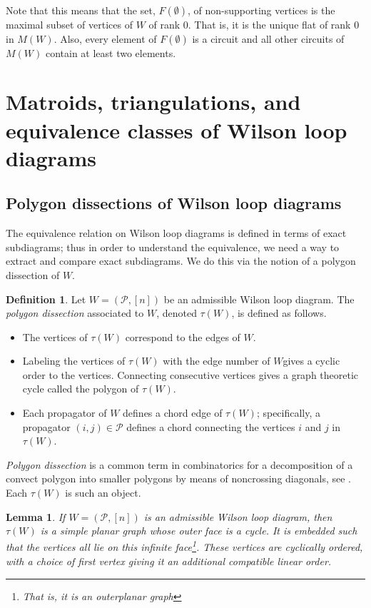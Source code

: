 \documentclass[11pt]{article}
\newcommand{\cP}{\mathcal{P}}
\newtheorem{lem}[thm]{Lemma}
\theoremstyle{remark}
\theoremstyle{definition}
\newtheorem{dfn}[thm]{Definition}
\begin{document}
Note that this means that the set, $F(\emptyset)$, of non-supporting vertices is the maximal subset of vertices of $W$ of rank $0$. That is, it is the unique flat of rank $0$ in $M(W)$. Also, every element of $F(\emptyset)$ is a circuit and all other circuits of $M(W)$ contain at least two elements.




\section{Matroids, triangulations, and equivalence classes of Wilson loop diagrams}\label{sec equiv}

\subsection{Polygon dissections of Wilson loop diagrams\label{sec: polygon partitions}}


The equivalence relation on Wilson loop diagrams is defined in terms of exact subdiagrams; thus in order to understand the equivalence, we need a way to extract and compare exact subdiagrams. We do this via the notion of a polygon dissection of $W$.

\begin{dfn}\label{WLDtriangulationdfn}
  Let $W = (\cP, [n])$ be an admissible Wilson loop diagram.  The \emph{polygon dissection} associated to $W$, denoted $\tau(W)$, is defined as follows.
  \begin{itemize}
  \item The vertices of $\tau(W)$ correspond to the edges of $W$.
  \item Labeling the vertices of $\tau(W)$ with the edge number of $W$gives a cyclic order to the vertices. Connecting consecutive vertices gives a graph theoretic cycle called the polygon of $\tau(W)$.
  \item Each propagator of $W$ defines a chord edge of $\tau(W)$; specifically,  a propagator $(i,j) \in \cP$ defines a chord connecting the vertices $i$ and $j$ in $\tau(W)$.
  \end{itemize}
\end{dfn}

\emph{Polygon dissection} is a common term in combinatorics for a decomposition of a convect polygon into smaller polygons by means of noncrossing diagonals, see \cite{PSpolygon}.  Each $\tau(W)$ is such an object.

\begin{lem}\label{tausimpleplanarlem}
If $W = (\cP, [n])$ is an admissible Wilson loop diagram, then $\tau(W)$ is a simple planar graph whose outer face is a cycle. It is embedded such that the vertices all lie on this infinite face\footnote{That is, it is an \emph{outerplanar} graph}. These vertices are cyclically ordered, with a choice of first vertex giving it an additional compatible linear order.
\end{lem}
\end{document}
